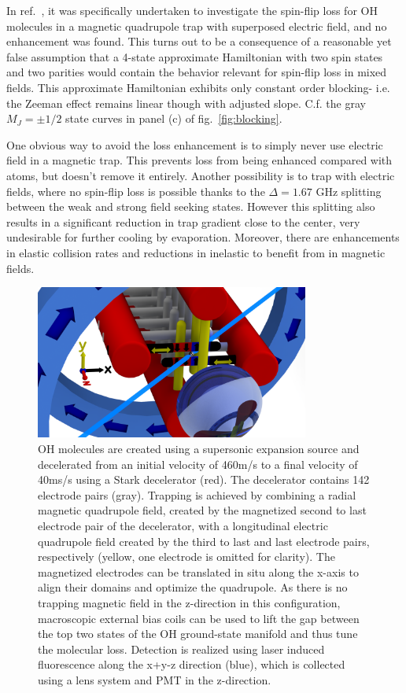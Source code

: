 \documentclass[%
 reprint,
 amsmath,amssymb,
 aps,
prl,
]{revtex4-1}
\begin{document}
In ref.~\cite{Lara2008}, it was specifically undertaken to investigate the spin-flip loss for OH molecules in a magnetic quadrupole trap with superposed electric field, and no enhancement was found. This turns out to be a consequence of a reasonable yet false assumption that a 4-state approximate Hamiltonian with two spin states and two parities would contain the behavior relevant for spin-flip loss in mixed fields. This approximate Hamiltonian exhibits only constant order blocking- i.e. the Zeeman effect remains linear though with adjusted slope. C.f. the gray $M_J=\pm1/2$ state curves in panel (c) of fig.~\ref{fig:blocking}.



One obvious way to avoid the loss enhancement is to simply never use electric field in a magnetic trap. This prevents loss from being enhanced compared with atoms, but doesn't remove it entirely. Another possibility is to trap with electric fields, where no spin-flip loss is possible thanks to the $\Delta=1.67\text{ GHz}$ splitting between the weak and strong field seeking states. However this splitting also results in a significant reduction in trap gradient close to the center, very undesirable for further cooling by evaporation. Moreover, there are enhancements in elastic collision rates and reductions in inelastic to benefit from in magnetic fields. \cite{stuhl2012evap}

\begin{figure}
\includegraphics[width=90mm]{blue-red-yellow-v2_CAD.png}%
\caption{
OH molecules are created using a supersonic expansion source and decelerated from an initial velocity of 460m/s to a final velocity of 40ms/s using a Stark decelerator (red). The decelerator contains 142 electrode pairs (gray). Trapping is achieved by combining a radial magnetic quadrupole field, created by the magnetized second to last electrode pair of the decelerator, with a longitudinal electric quadrupole field created by the third to last and last electrode pairs, respectively (yellow, one electrode is omitted for clarity). The magnetized electrodes can be translated in situ along the x-axis to align their domains and optimize the quadrupole. As there is no trapping magnetic field in the z-direction in this configuration, macroscopic external bias coils can be used to lift the gap between the top two states of the OH ground-state manifold and thus tune the molecular loss. Detection is realized using laser induced fluorescence along the x+y-z direction (blue), which is collected using a lens system and PMT in the z-direction.
\label{fig:CAD}}
\end{figure}
\end{document}
